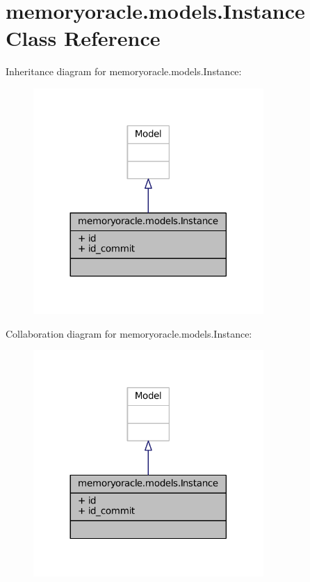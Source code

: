 \hypertarget{classmemoryoracle_1_1models_1_1Instance}{}\section{memoryoracle.\+models.\+Instance Class Reference}
\label{classmemoryoracle_1_1models_1_1Instance}


Inheritance diagram for memoryoracle.\+models.\+Instance\+:\nopagebreak
\begin{figure}[H]
\begin{center}
\leavevmode
\includegraphics[width=248pt]{classmemoryoracle_1_1models_1_1Instance__inherit__graph}
\end{center}
\end{figure}


Collaboration diagram for memoryoracle.\+models.\+Instance\+:\nopagebreak
\begin{figure}[H]
\begin{center}
\leavevmode
\includegraphics[width=248pt]{classmemoryoracle_1_1models_1_1Instance__coll__graph}
\end{center}
\end{figure}
